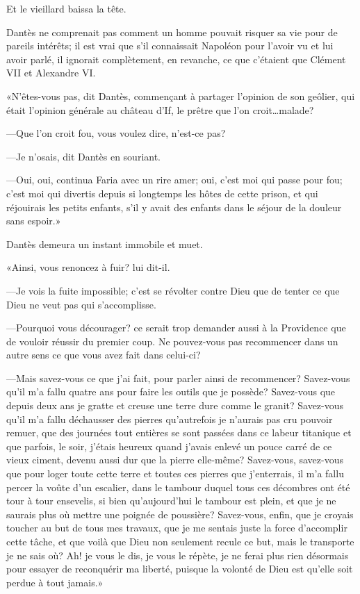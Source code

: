 Et le vieillard baissa la tête.

Dantès ne comprenait pas comment un homme pouvait risquer sa vie pour de pareils intérêts; il est vrai que s'il connaissait Napoléon pour l'avoir vu et lui avoir parlé, il ignorait complètement, en revanche, ce que c'étaient que Clément VII et Alexandre VI.

«N'êtes-vous pas, dit Dantès, commençant à partager l'opinion de son geôlier, qui était l'opinion générale au château d'If, le prêtre que l'on croit\dots malade?

—Que l'on croit fou, vous voulez dire, n'est-ce pas?

—Je n'osais, dit Dantès en souriant.

—Oui, oui, continua Faria avec un rire amer; oui, c'est moi qui passe pour fou; c'est moi qui divertis depuis si longtemps les hôtes de cette prison, et qui réjouirais les petits enfants, s'il y avait des enfants dans le séjour de la douleur sans espoir.»

Dantès demeura un instant immobile et muet.

«Ainsi, vous renoncez à fuir? lui dit-il.

—Je vois la fuite impossible; c'est se révolter contre Dieu que de tenter ce que Dieu ne veut pas qui s'accomplisse.

—Pourquoi vous décourager? ce serait trop demander aussi à la Providence que de vouloir réussir du premier coup. Ne pouvez-vous pas recommencer dans un autre sens ce que vous avez fait dans celui-ci?

—Mais savez-vous ce que j'ai fait, pour parler ainsi de recommencer? Savez-vous qu'il m'a fallu quatre ans pour faire les outils que je possède? Savez-vous que depuis deux ans je gratte et creuse une terre dure comme le granit? Savez-vous qu'il m'a fallu déchausser des pierres qu'autrefois je n'aurais pas cru pouvoir remuer, que des journées tout entières se sont passées dans ce labeur titanique et que parfois, le soir, j'étais heureux quand j'avais enlevé un pouce carré de ce vieux ciment, devenu aussi dur que la pierre elle-même? Savez-vous, savez-vous que pour loger toute cette terre et toutes ces pierres que j'enterrais, il m'a fallu percer la voûte d'un escalier, dans le tambour duquel tous ces décombres ont été tour à tour ensevelis, si bien qu'aujourd'hui le tambour est plein, et que je ne saurais plus où mettre une poignée de poussière? Savez-vous, enfin, que je croyais toucher au but de tous mes travaux, que je me sentais juste la force d'accomplir cette tâche, et que voilà que Dieu non seulement recule ce but, mais le transporte je ne sais où? Ah! je vous le dis, je vous le répète, je ne ferai plus rien désormais pour essayer de reconquérir ma liberté, puisque la volonté de Dieu est qu'elle soit perdue à tout jamais.»

